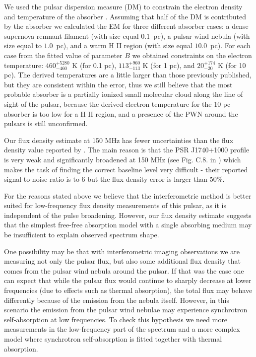 \documentclass[manuscript]{aastex63}
\begin{document}
We used the pulsar dispersion measure (DM) to constrain the electron density and temperature of the absorber \citep[see][and references therein]{2018Rozko}. Assuming that half of the DM is contributed by the absorber  we calculated the EM for three different absorber cases: a dense supernova remnant filament (with size equal $0.1$~pc), a pulsar wind nebula (with size equal to $1.0$~pc), and a warm H II region (with size equal $10.0$~pc). For each case from the fitted value of parameter $B$ we obtained constraints on the electron temperature: $460^{+5280}_{-460}$ K (for 0.1 pc), $113^{+960}_{-113}$ K (for 1 pc), and $20^{+174}_{-20}$ K (for 10 pc). The derived temperatures are a little larger than those previously published, but they are consistent within the error, thus we still believe that the most probable absorber is a partially ionized small molecular cloud along the line of sight of the pulsar, because the derived electron temperature for the 10 pc absorber is too low for a H II region, and a presence of the PWN around the pulsars is still unconfirmed.  

Our flux density estimate at 150 MHz has fewer uncertainties than the flux density value reported by \citet{2016Bilous}. The main reason is that the PSR J1740+1000 profile is very weak and significantly broadened at 150 MHz (see Fig. C.8. in \citealt{2016Bilous}) which makes the task of finding the correct baseline level very difficult - their reported signal-to-noise ratio is to 6 but the flux density error is larger than 50\%. 

For the reasons stated above we believe that the interferometric method is better suited for low-frequency flux density measurements of this pulsar, as it is independent of the pulse broadening. However, our flux density estimate suggests that the simplest free-free absorption model with a single absorbing medium may be insufficient to explain observed spectrum shape. 

One possibility may be that with interferometric imaging observations we are measuring not only the pulsar flux, but also some additional flux density that comes from the pulsar wind nebula around the pulsar. If that was the case one can expect that while the pulsar flux would continue to sharply decrease at lower frequencies (due to effects such as thermal absorption), the total flux may behave differently because of the emission from the nebula itself. However, in this scenario the emission from the pulsar wind nebulae may experience synchrotron self-absorption at low frequencies. To check this hypothesis we need more measurements in the low-frequency part of the spectrum and a more complex model where synchrotron self-absorption is fitted together with thermal absorption.  
\end{document}
